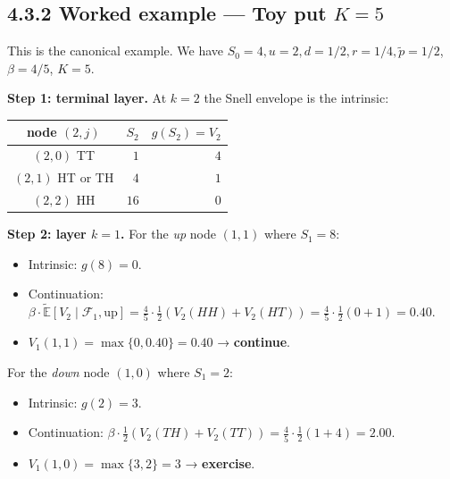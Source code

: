 \documentclass[
  10pt,
  twoside]{book}
\newcounter{none} %
\providecommand{\tightlist}{%
  \setlength{\itemsep}{0pt}\setlength{\parskip}{0pt}}
\begin{document}
\subsection{\texorpdfstring{4.3.2 Worked example --- Toy put
\(K = 5\)}{4.3.2 Worked example --- Toy put K = 5}}\label{worked-example-toy-put-k-5}

This is the canonical example. We have
\(S_0 = 4, u = 2, d = 1/2, r = 1/4, \tilde p = 1/2\), \(\beta = 4/5\),
\(K = 5\).

\textbf{Step 1: terminal layer.} At \(k = 2\) the Snell envelope is the
intrinsic:

{\def\LTcaptype{none} %
\begin{table}[H]
\centering
\begin{tabular}{|c|r|r|}
\toprule
node \((2, j)\) & \(S_2\) & \(g(S_2) = V_2\) \\
\midrule



\((2, 0)\) TT & \(1\) & \(4\) \\
\((2, 1)\) HT or TH & \(4\) & \(1\) \\
\((2, 2)\) HH & \(16\) & \(0\) \\
\bottomrule
\end{tabular}
\end{table}
}

\textbf{Step 2: layer \(k = 1\).} For the \emph{up} node \((1, 1)\)
where \(S_1 = 8\):

\begin{itemize}
\tightlist
\item
  Intrinsic: \(g(8) = 0\).
\item
  Continuation:
  \(\beta\!\cdot\!\tilde{\mathbb{E}}[V_2\mid\mathcal F_1, \text{up}] = \tfrac{4}{5}\!\cdot\!\tfrac{1}{2}(V_2(HH) + V_2(HT)) = \tfrac{4}{5}\!\cdot\!\tfrac{1}{2}(0 + 1) = 0.40\).
\item
  \(V_1(1, 1) = \max\{0, 0.40\} = 0.40\) → \textbf{continue}.
\end{itemize}

For the \emph{down} node \((1, 0)\) where \(S_1 = 2\):

\begin{itemize}
\tightlist
\item
  Intrinsic: \(g(2) = 3\).
\item
  Continuation:
  \(\beta\!\cdot\!\tfrac{1}{2}(V_2(TH) + V_2(TT)) = \tfrac{4}{5}\!\cdot\!\tfrac{1}{2}(1 + 4) = 2.00\).
\item
  \(V_1(1, 0) = \max\{3, 2\} = 3\) → \textbf{exercise}.
\end{itemize}
\end{document}
